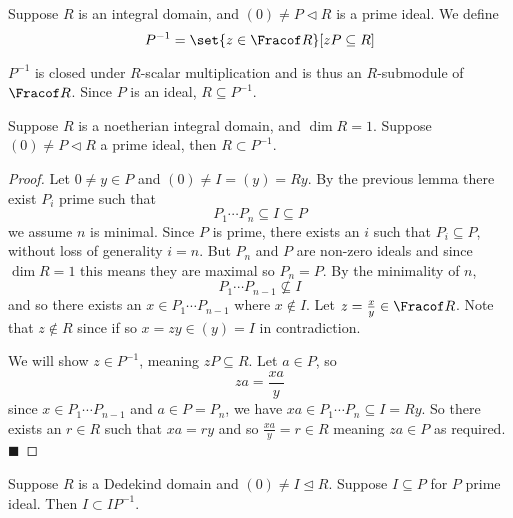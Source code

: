 \documentclass[10pt]{article}
\let\ideal=\trianglelefteq
\let\pideal=\triangleleft
\def\qed{%
    \ifmmode%
        \eqno\blacksquare%
    \else%
        \hskip1cm\allowbreak\hbox{}\nobreak\hfill$\blacksquare$%
    \fi%
}
\begin{document}
\begin{defn*}

    Suppose $R$ is an integral domain, and $(0)\neq P\pideal R$ is a prime ideal.
    We define
    \[ P^{-1} = \set{z\in\Fracof R}[zP\subseteq R] \]

\end{defn*}

$P^{-1}$ is closed under $R$-scalar multiplication and is thus an $R$-submodule of $\Fracof R$.
Since $P$ is an ideal, $R\subseteq P^{-1}$.

\begin{lemm*}

    Suppose $R$ is a noetherian integral domain, and $\dim R=1$.
    Suppose $(0)\neq P\pideal R$ a prime ideal, then $R\subset P^{-1}$.

\end{lemm*}

\begin{proof}

    Let $0\neq y\in P$ and $(0)\neq I=(y)=Ry$.
    By the previous lemma there exist $P_i$ prime such that
    \[ P_1\cdots P_n \subseteq I\subseteq P \]
    we assume $n$ is minimal.
    Since $P$ is prime, there exists an $i$ such that $P_i\subseteq P$, without loss of generality $i=n$.
    But $P_n$ and $P$ are non-zero ideals and since $\dim R=1$ this means they are maximal so $P_n=P$.
    By the minimality of $n$,
    \[ P_1\cdots P_{n-1}\nsubseteq I \]
    and so there exists an $x\in P_1\cdots P_{n-1}$ where $x\notin I$.
    Let $z=\frac xy\in\Fracof R$.
    Note that $z\notin R$ since if so $x=zy\in(y)=I$ in contradiction.

    We will show $z\in P^{-1}$, meaning $zP\subseteq R$.
    Let $a\in P$, so
    \[ za = \frac{xa}y \]
    since $x\in P_1\cdots P_{n-1}$ and $a\in P=P_n$, we have $xa\in P_1\cdots P_n\subseteq I=Ry$.
    So there exists an $r\in R$ such that $xa=ry$ and so $\frac{xa}y=r\in R$ meaning $za\in P$ as required.
    \qed

\end{proof}

\begin{lemm*}

    Suppose $R$ is a Dedekind domain and $(0)\neq I\ideal R$.
    Suppose $I\subseteq P$ for $P$ prime ideal.
    Then $I\subset IP^{-1}$.

\end{lemm*}
\end{document}
